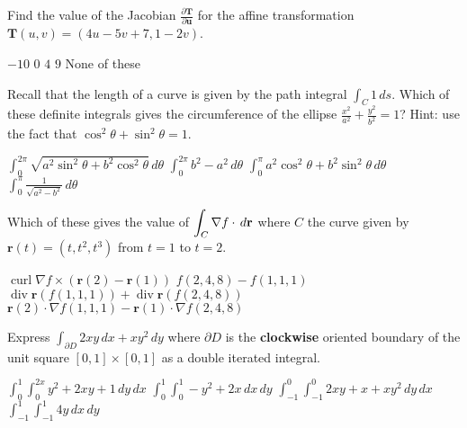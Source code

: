 \documentclass[12pt]{exam}
\newcommand{\ds}{\ensuremath{\displaystyle}}
\newcommand{\vect}[1]{\ensuremath{\mathbf{#1}}}
\newcommand{\<}{\langle}
\renewcommand{\>}{\rangle}
\newcommand{\p}{\partial}
\newcommand{\dvar}{\,d}
\begin{document}
\begin{questions}

\setcounter{question}{0}
\question[20]
Find the value of the Jacobian \(\frac{\p\vect T}{\p\vect u}\) for
the affine transformation \(\vect T(u,v)=(4u-5v+7,1-2v)\).


\begin{checkboxes}
\choice \(-10\)
\choice \(0\)
\choice \(4\)
\choice \(9\)
\choice None of these
\end{checkboxes}

\vfill

\question[20]
Recall that the length of a curve is given by the path integral
\(\int_C 1\dvar s\). Which of these definite integrals
gives the circumference of the
ellipse \(\frac{x^2}{a^2}+\frac{y^2}{b^2}=1\)? Hint: use the fact that
\(\cos^2\theta+\sin^2\theta=1\).

\begin{checkboxes}
\choice \(\int_0^{2\pi}\sqrt{a^2\sin^2\theta+b^2\cos^2\theta}\dvar\theta\)
\choice \(\int_0^{2\pi}b^2-a^2\dvar\theta\)
\choice \(\int_0^{\pi}a^2\cos^2\theta+b^2\sin^2\theta\dvar\theta\)
\choice \(\int_0^{\pi}\frac{1}{\sqrt{a^2-b^2}}\dvar\theta\)
\end{checkboxes}

\vfill

\question[20]
Which of these gives the value of
\(
  \ds\int_C
    \nabla f
  \cdot\dvar\vect r
\) where \(C\) the curve given by \(\vect r(t)=(t,t^2,t^3)\) from \(t=1\)
to \(t=2\).

\begin{checkboxes}
\choice \(\operatorname{curl} \nabla f\times(\vect r(2)-\vect r(1))\)
\choice \(f(2,4,8)-f(1,1,1)\)
\choice \(\operatorname{div}\vect r(f(1,1,1))+\operatorname{div}\vect r(f(2,4,8))\)
\choice \(\vect r(2)\cdot\nabla f(1,1,1)-\vect r(1)\cdot\nabla f(2,4,8)\)
\end{checkboxes}

\vfill
\newpage

\question[20]
Express \(\int_{\p D}2xy\dvar x+xy^2\dvar y\) where \(\p D\) is the
\textbf{clockwise} oriented boundary of the unit square \([0,1]\times[0,1]\)
as a double iterated integral.
\begin{checkboxes}
  \choice \(\int_0^1\int_0^{2x}y^2+2xy+1\dvar y\dvar x\)
  \choice \(\int_0^1\int_0^1 -y^2+2x\dvar x\dvar y\)
  \choice \(\int_{-1}^0\int_{-1}^0 2xy+x+xy^2\dvar y\dvar x\)
  \choice \(\int_{-1}^1\int_{-1}^1 4y\dvar x\dvar y\)
\end{checkboxes}


\end{questions}
\end{document}
